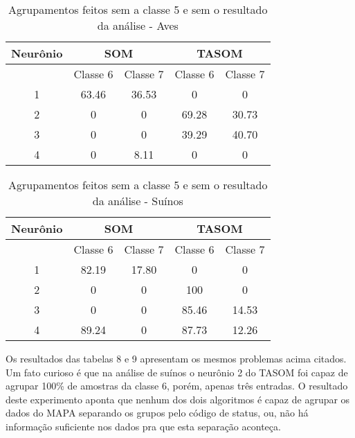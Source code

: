 \begin{table}[h]
\centering
\caption{Agrupamentos feitos sem a classe 5 e sem o resultado da análise - Aves}
\label{my-label}
\begin{tabular}{|c|c|c|c|c|}
\hline
Neurônio & \multicolumn{2}{c|}{SOM} & \multicolumn{2}{c|}{TASOM} \\ \hline
         & Classe 6    & Classe 7   & Classe 6     & Classe 7    \\ \hline
1        & 63.46       & 36.53      & 0            & 0           \\ \hline
2        & 0           & 0          & 69.28        & 30.73       \\ \hline
3        & 0           & 0          & 39.29        & 40.70       \\ \hline
4        & 0           & 8.11       & 0            & 0           \\ \hline
\end{tabular}
\end{table}

\begin{table}[h]
\centering
\caption{Agrupamentos feitos sem a classe 5 e sem o resultado da análise - Suínos}
\label{my-label}
\begin{tabular}{|c|c|c|c|c|}
\hline
Neurônio & \multicolumn{2}{c|}{SOM} & \multicolumn{2}{c|}{TASOM} \\ \hline
         & Classe 6    & Classe 7   & Classe 6     & Classe 7    \\ \hline
1        & 82.19       & 17.80      & 0            & 0           \\ \hline
2        & 0           & 0          & 100          & 0           \\ \hline
3        & 0           & 0          & 85.46        & 14.53       \\ \hline
4        & 89.24       & 0          & 87.73        & 12.26       \\ \hline
\end{tabular}
\end{table}

Os resultados das tabelas 8 e 9 apresentam os mesmos problemas acima citados. Um fato curioso é que na análise de suínos o neurônio 2 do TASOM foi capaz de agrupar 100\% de amostras da classe 6, porém, apenas três entradas. O resultado deste experimento aponta que nenhum dos dois algoritmos é capaz de agrupar os dados do MAPA separando os grupos pelo código de status, ou, não há informação suficiente nos dados pra que esta separação aconteça.

